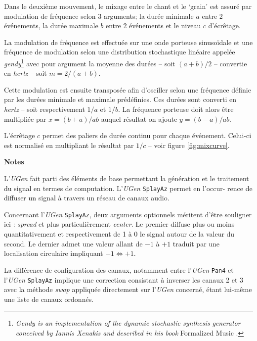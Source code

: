 Dans le deuxi\`eme mouvement, le mixage entre le chant et le `grain' est assur\'e par modulation de fr\'equence selon 3 arguments; la dur\'ee minimale $a$ entre 2 \'ev\'enements, la dur\'ee maximale $b$ entre 2 \'ev\'enements et le niveau $c$ d'\'ecr\^etage. 

\smallskip

La modulation de fr\'equence est effectu\'ee sur une onde porteuse sinuso\"idale et une fr\'equence de modulation selon une distribution stochastique lin\'eaire appel\'ee \textit{gendy}\footnote{\textit{Gendy is an implementation of the dynamic stochastic synthesis generator conceived by Iannis Xenakis and described in his book} Formalized Music \citep[chapter 9 pp. 246-254 and chapters 13 and 14 pp. 289-322]{ix}.} avec pour argument la moyenne des dur\'ees -- soit $(a+b)/2$ -- convertie en \textit{hertz} -- soit $m= 2/(a+b)$. 

\smallskip

Cette modulation est ensuite transpos\'ee afin d'osciller selon une fr\'equence d\'efinie par les dur\'ees minimale et maximale pr\'ed\'efinies. Ces dur\'ees sont converti en \textit{hertz} -- soit respectivement $1/a$ et $1/b$. La fr\'equence porteuse doit alors \^etre multipli\'ee par $x=(b+a)/ab$ auquel r\'esultat on ajoute $y=(b-a)/ab$.

\smallskip

L'\'ecr\^etage $c$ permet des paliers de dur\'ee continu pour chaque \'ev\'enement. Celui-ci est normalis\'e en multipliant le r\'esultat par $1/c$ -- voir figure \ref{fig:mixcurve}.

\bigskip

\noindent \textbf{{\large Notes}}
\hrulefill

\bigskip

L'\textsl{UGen} fait parti des \'el\'ements de base permettant la g\'en\'eration et le traitement du signal en termes de computation. L'\textsl{UGen}  \texttt{SplayAz} permet en l'occur- rence de diffuser un signal \`a travers un r\'eseau de canaux audio.

Concernant l'\textsl{UGen} \texttt{SplayAz}, deux arguments optionnels m\'eritent d'\^etre souligner ici : \textsl{spread} et plus particuli\`erement \textsl{center}. Le premier diffuse plus ou moins  quantitativement et respectivement de 1 \`a 0 le signal autour de la valeur du second. Le dernier admet une valeur allant de $-1$ \`a $+1$ traduit par une localisation circulaire impliquant $-1 \Leftrightarrow +1$.
\bigskip

La diff\'erence de configuration des canaux, notamment entre l'\textsl{UGen} \texttt{Pan4}  et l'\textsl{UGen} \texttt{SplayAz}  implique une correction consistant \`a inverser les canaux 2 et 3 avec la m\'ethode \textsl{swap} appliqu\'ee directement sur l'\textsl{UGen} concern\'e, \'etant lui-m\^eme une liste de canaux ordonn\'es.

